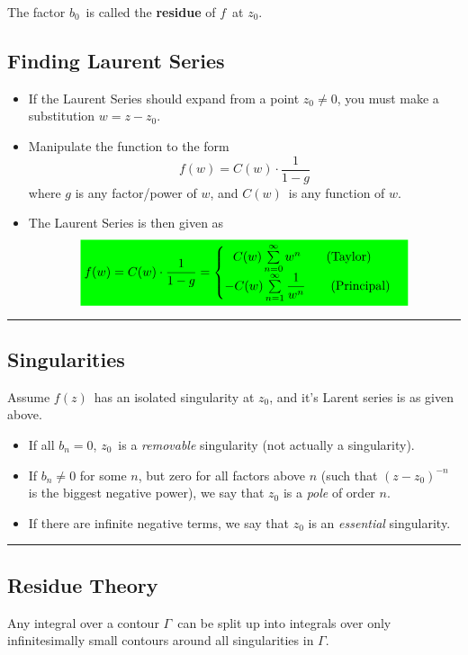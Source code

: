\documentclass[10pt,a4paper]{article}
\newcommand{\holine}{\rule{286pt}{1pt}}
\newcommand{\gr}[1]{\colorbox{green}{$\displaystyle #1$}}
\begin{document}
\begin{multicols}{2}
The factor $b_0$ is called the \textbf{residue} of $f$ at $z_0$.

\subsection*{Finding Laurent Series}
\begin{itemize}
    \item If the Laurent Series should expand from a point $z_0 \neq 0$, you must make a substitution $w = z - z_0$.
    \item Manipulate the function to the form
    \[
        f(w) = C(w)\cdot \frac{1}{1-g}
    \]
    where $g$ is any factor/power of $w$, and $C(w)$ is any function of $w$.
    \item The Laurent Series is then given as
\[
\gr{
    f(w) = C(w)\cdot \frac{1}{1-g} = \begin{cases} \ \ C(w)\sum\limits_{n=0}^\infty w^n \quad\quad \text{(Taylor)} \\ -C(w)\sum\limits_{n=1}^\infty\dfrac{1}{w^n} \quad\quad \text{(Principal)} \end{cases}
}
\]
\end{itemize}



\holine
\subsection*{Singularities}
Assume $f(z)$ has an isolated singularity at $z_0$, and it's Larent series is as given above.
\begin{itemize}
    \item If all $b_n = 0$, $z_0$ is a \textit{removable} singularity (not actually a singularity).
    \item If $b_n \neq 0$ for some $n$, but zero for all factors above $n$ (such that $(z-z_0)^{-n}$ is the biggest negative power), we say that $z_0$ is a \textit{pole} of order $n$.
    \item If there are infinite negative terms, we say that $z_0$ is an \textit{essential} singularity.
\end{itemize}


\holine
\subsection*{Residue Theory}
Any integral over a contour $\Gamma$ can be split up into integrals over only infinitesimally small contours around all singularities in $\Gamma$.


\end{multicols}
\end{document}
